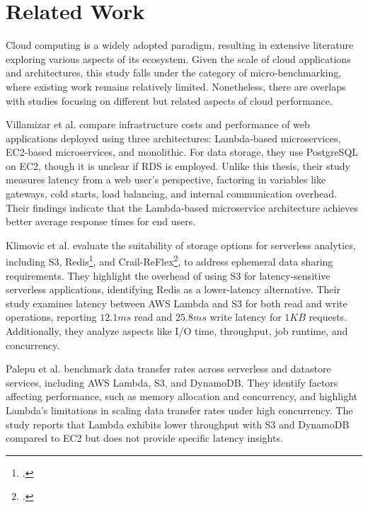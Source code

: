 \section{Related Work}
\label{cha:relatedwork}

Cloud computing is a widely adopted paradigm, resulting in extensive literature exploring various aspects of its ecosystem. Given the scale of cloud applications and architectures, this study falls under the category of micro-benchmarking, where existing work remains relatively limited. Nonetheless, there are overlaps with studies focusing on different but related aspects of cloud performance.

Villamizar et al. \cite{paper_villamizar_lambdaXec2} compare infrastructure costs and performance of web applications deployed using three architectures: Lambda-based microservices, EC2-based microservices, and monolithic. For data storage, they use PostgreSQL on EC2, though it is unclear if RDS is employed. Unlike this thesis, their study measures latency from a web user’s perspective, factoring in variables like gateways, cold starts, load balancing, and internal communication overhead. Their findings indicate that the Lambda-based microservice architecture achieves better average response times for end users.

Klimovic et al. \cite{paper_klimovic_lambdaXs3} evaluate the suitability of storage options for serverless analytics, including S3, Redis\footcite{https://redis.io/}, and Crail-ReFlex\footcite{https://craillabs.github.io/}, to address ephemeral data sharing requirements. They highlight the overhead of using S3 for latency-sensitive serverless applications, identifying Redis as a lower-latency alternative. Their study examines latency between AWS Lambda and S3 for both read and write operations, reporting $12.1ms$ read and $25.8ms$ write latency for $1KB$ requests. Additionally, they analyze aspects like I/O time, throughput, job runtime, and concurrency.

Palepu et al. \cite{paper_palepu_lambdaXs3ddb} benchmark data transfer rates across serverless and datastore services, including AWS Lambda, S3, and DynamoDB. They identify factors affecting performance, such as memory allocation and concurrency, and highlight Lambda's limitations in scaling data transfer rates under high concurrency. The study reports that Lambda exhibits lower throughput with S3 and DynamoDB compared to EC2 but does not provide specific latency insights.

